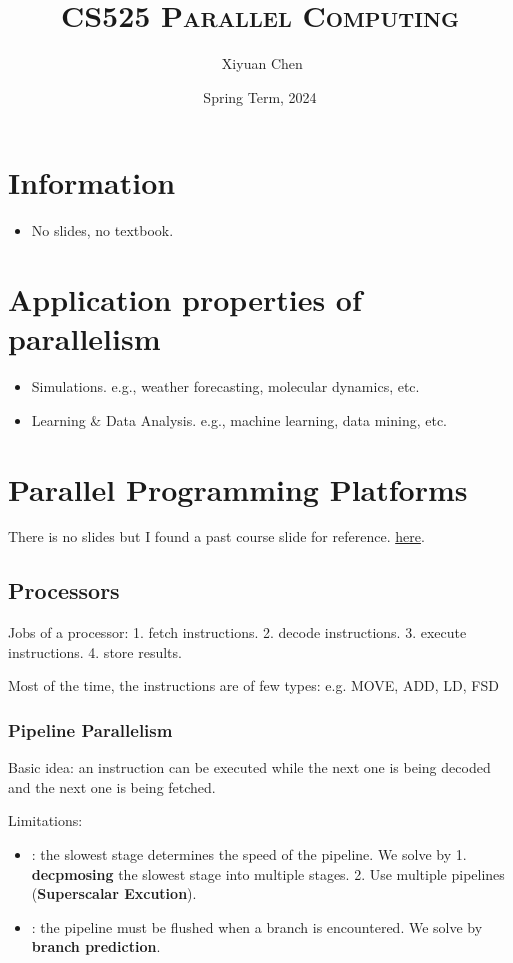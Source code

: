 \documentclass{../../ainote}
\author{\ccLogo \,\,Xiyuan Chen}
\title{\textsc{CS525 Parallel Computing}}
\date{Spring Term, 2024}
\begin{document}
\maketitle
\doclicenseThis
\section*{Information}
\begin{itemize}
	\item No slides, no textbook.
\end{itemize}
\tableofcontents
\newpage

\section{Application properties of parallelism}
\begin{itemize}
    \item Simulations. e.g., weather forecasting, molecular dynamics, etc.
    \item Learning \& Data Analysis. e.g., machine learning, data mining, etc.
\end{itemize}

\section{Parallel Programming Platforms}
There is no slides but I found a past course slide for reference. \href{https://www.cs.purdue.edu/homes/ayg/CS525_SPR17/chap2_slides.pdf}{here}.

\subsection{Processors}
Jobs of a processor: 1. fetch instructions. 2. decode instructions. 3. execute instructions. 4. store results.

Most of the time, the instructions are of few types: e.g. MOVE, ADD, LD, FSD

\subsubsection{Pipeline Parallelism}
Basic idea: an instruction can be executed while the next one is being decoded and the next one is being fetched.

Limitations: 
\begin{itemize}
    \item {}: the slowest stage determines the speed of the pipeline. We solve by 1. \textbf{decpmosing} the slowest stage into multiple stages. 2. Use multiple pipelines (\textbf{Superscalar Excution}).
    \item {}: the pipeline must be flushed when a branch is encountered. We solve by \textbf{branch prediction}.
\end{itemize}
\end{document}
